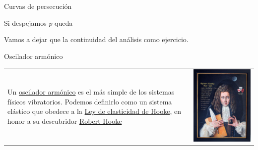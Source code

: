 \documentclass[handout,hyperref={colorlinks=true}]{beamer}
\begin{document}
\begin{frame}{Curvas de persecución}

Si despejamos $p$ queda


Vamos a dejar que la continuidad del análisis como ejercicio.
 
 
\end{frame}

\begin{frame}{Oscilador armónico}\label{resortito}

\begin{tabular}{m{6cm} m{2cm}}
 Un \href{http://es.wikipedia.org/wiki/Oscilador_armónico}{oscilador armónico} es el más simple de los sistemas físicos vibratorios. Podemos definirlo como un sistema
elástico que obedece a la \href{http://es.wikipedia.org/wiki/Ley_de_Hooke}{Ley de elasticidad de Hooke}, en honor a su descubridor 
\href{http://es.wikipedia.org/wiki/Robert_Hooke}{Robert Hooke} & \includegraphics[scale=.15]{imagenes/Hooke.JPG}\\
\end{tabular}

 
\end{frame}
\end{document}
